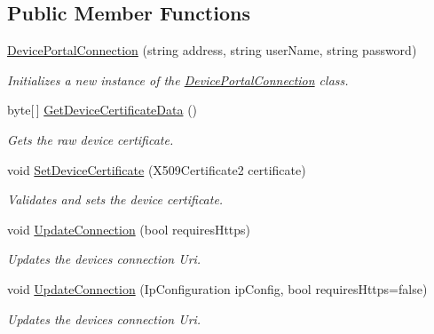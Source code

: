 \subsection*{Public Member Functions}
\begin{DoxyCompactItemize}
\item 
\hyperlink{class_test_app_1_1_device_portal_connection_a7b3441c47ea2bc9fec554f24f8c1d882}{Device\+Portal\+Connection} (string address, string user\+Name, string password)
\begin{DoxyCompactList}\small\item\em Initializes a new instance of the \hyperlink{class_test_app_1_1_device_portal_connection}{Device\+Portal\+Connection} class. \end{DoxyCompactList}\item 
byte\mbox{[}$\,$\mbox{]} \hyperlink{class_test_app_1_1_device_portal_connection_a5366a7f57da42fcd5274ff00ffcdff4c}{Get\+Device\+Certificate\+Data} ()
\begin{DoxyCompactList}\small\item\em Gets the raw device certificate. \end{DoxyCompactList}\item 
void \hyperlink{class_test_app_1_1_device_portal_connection_a944c076509b9c301bfca539570e0990b}{Set\+Device\+Certificate} (X509\+Certificate2 certificate)
\begin{DoxyCompactList}\small\item\em Validates and sets the device certificate. \end{DoxyCompactList}\item 
void \hyperlink{class_test_app_1_1_device_portal_connection_ad68933acabeaef399edae7c611931bc6}{Update\+Connection} (bool requires\+Https)
\begin{DoxyCompactList}\small\item\em Updates the device\textquotesingle{}s connection Uri. \end{DoxyCompactList}\item 
void \hyperlink{class_test_app_1_1_device_portal_connection_a3abb3edbff491de3e1035e60eaf75ea5}{Update\+Connection} (Ip\+Configuration ip\+Config, bool requires\+Https=false)
\begin{DoxyCompactList}\small\item\em Updates the device\textquotesingle{}s connection Uri. \end{DoxyCompactList}\end{DoxyCompactItemize}
